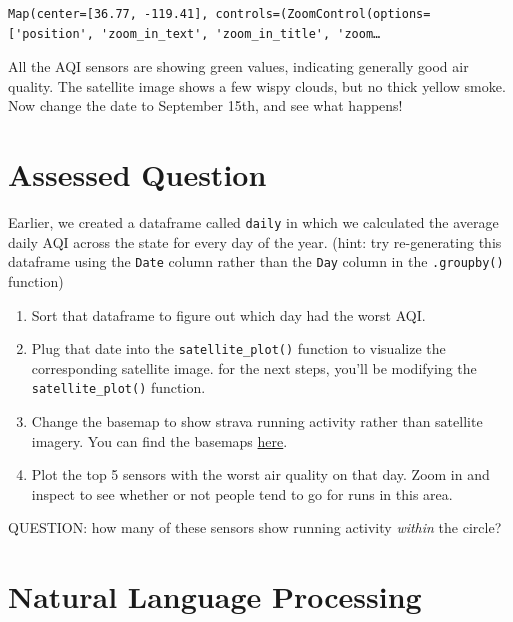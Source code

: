 \documentclass[
  letterpaper,
  DIV=11,
  numbers=noendperiod]{scrreprt}
\providecommand{\tightlist}{%
  \setlength{\itemsep}{0pt}\setlength{\parskip}{0pt}}\usepackage{longtable,booktabs,array}
\begin{document}
\begin{verbatim}
Map(center=[36.77, -119.41], controls=(ZoomControl(options=['position', 'zoom_in_text', 'zoom_in_title', 'zoom…
\end{verbatim}

All the AQI sensors are showing green values, indicating generally good
air quality. The satellite image shows a few wispy clouds, but no thick
yellow smoke. Now change the date to September 15th, and see what
happens!


\hypertarget{assessed-question-2}{%
\chapter{Assessed Question}\label{assessed-question-2}}

Earlier, we created a dataframe called \texttt{daily} in which we
calculated the average daily AQI across the state for every day of the
year. (hint: try re-generating this dataframe using the \texttt{Date}
column rather than the \texttt{Day} column in the \texttt{.groupby()}
function)

\begin{enumerate}
\def\labelenumi{\arabic{enumi}.}
\tightlist
\item
  Sort that dataframe to figure out which day had the worst AQI.
\item
  Plug that date into the \texttt{satellite\_plot()} function to
  visualize the corresponding satellite image. for the next steps,
  you'll be modifying the \texttt{satellite\_plot()} function.
\item
  Change the basemap to show strava running activity rather than
  satellite imagery. You can find the basemaps
  \href{https://ipyleaflet.readthedocs.io/en/latest/map_and_basemaps/basemaps.html}{here}.
\item
  Plot the top 5 sensors with the worst air quality on that day. Zoom in
  and inspect to see whether or not people tend to go for runs in this
  area.
\end{enumerate}

QUESTION: how many of these sensors show running activity \emph{within}
the circle?


\hypertarget{natural-language-processing}{%
\chapter{Natural Language
Processing}\label{natural-language-processing}}
\end{document}
